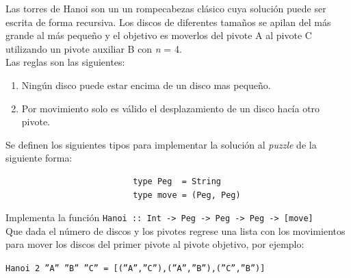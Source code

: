     \begin{exercise}
        Las torres de Hanoi son un un rompecabezas clásico cuya solución puede ser escrita de forma recursiva. Los discos de diferentes tamaños se apilan del más grande al más pequeño y el objetivo es moverlos del pivote A al pivote C utilizando un pivote auxiliar B con \textit{n} = 4.\\
        
        Las reglas son  las siguientes: 
        
        \begin{enumerate}
            \item Ningún disco puede estar encima de un disco mas pequeño. 
            \item Por movimiento solo es válido el desplazamiento de un disco hacía otro pivote.
        \end{enumerate}

        Se definen los siguientes tipos para implementar la solución al \textit{puzzle} de la siguiente forma: 

        \begin{center}
            \begin{verbatim}
                          type Peg  = String
                          type move = (Peg, Peg)
            \end{verbatim}
        \end{center}
        

        Implementa la función \texttt{Hanoi :: Int ->\ Peg ->\ Peg ->\ Peg ->\ [move]}\\
        Que dada el número de discos y los pivotes regrese una lista con los movimientos para mover los discos del primer pivote al pivote objetivo, por ejemplo: \\
        \begin{center}
            \texttt{Hanoi 2  ''A'' ''B'' ''C'' = [(''A'',''C''),(''A'',''B''),(''C'',''B'')]}
        \end{center}
    \end{exercise}  



